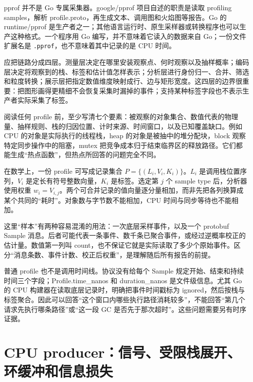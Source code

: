 \documentclass[UTF8,fontset=fandol,openany,11pt]{ctexbook}
\begin{document}
pprof 并不是 Go 专属采集器。google/pprof 项目自述的职责是读取 profiling samples，解析 profile.proto，再生成文本、调用图和火焰图等报告。Go 的 runtime/pprof 是生产者之一；其他语言运行时、原生采样器或转换程序也可以生产这种格式。一个程序用 Go 编写，并不意味着它读入的数据来自 Go；一份文件扩展名是 \texttt{.\allowbreak{}pprof}，也不意味着其中记录的是 CPU 时间。\cite{pp-scope}\cite{pp-proto}


应把链路分成四层。测量层决定在哪里安装观察点、何时观察以及抽样概率；编码层决定将观察到的栈、标签和估计值怎样表示；分析层进行身份归一、合并、筛选和粒度转换；展示层把指定数值维度映射成行、边与矩形宽度。这四层的边界很重要：把图形画得更精细不会恢复采集时漏掉的事件；支持某种标签字段也不表示生产者实际采集了标签。\cite{pp-proto}\cite{pp-cpu-builder}


阅读任何 profile 前，至少写清七个要素：被观察的对象集合、数值代表的物理量、抽样规则、栈的归因位置、计时来源、时间窗口，以及已知覆盖缺口。例如 CPU 的对象是实际执行的线程栈，heap 的对象是被抽中的堆分配块，block 观察特定同步操作中的阻塞，mutex 把竞争成本归于结束临界区的释放路径。它们都能生成“热点函数”，但热点所回答的问题完全不同。\cite{pp-cpu-runtime}\cite{pp-heap-scale}\cite{pp-mprof}\cite{pp-sema}


在数学上，一份 profile 可写成记录集合 \(P=\{(L_i,V_i,K_i)\}\)。\(L_i\) 是调用栈位置序列，\(V_i\) 是定长有符号整数向量，\(K_i\) 是标签。选定第 \(j\) 个 sample type 后，分析器使用权重 \(w_i=V_{i,j}\)。两个可合并记录的值向量逐分量相加，而非先把各列换算成某个共同的“耗时”。对象数与字节数不能相加，CPU 时间与同步等待也不能相加。\cite{pp-proto}


这里“样本”有两种容易混淆的用法：一次底层采样事件，以及一个 protobuf Sample 消息。后者可能代表一条事件、数千条已聚合事件，或经过逆概率校正的估计量。数值第一列叫 count，也不保证它就是实际读取了多少个原始事件。区分“消息条数、事件计数、校正后权重”，是理解随后所有报告的前提。\cite{pp-cpu-builder}\cite{pp-heap-scale}\cite{pp-mprof}


普通 profile 也不是调用时间线。协议没有给每个 Sample 规定开始、结束和持续时间三个字段；Profile.time\_\allowbreak{}nanos 和 duration\_\allowbreak{}nanos 是文件级信息。尤其 Go 的 CPU 构建器在读取底层记录时，明确把事件时间戳标为 ignored，然后按栈与标签聚合。因此可以回答“这个窗口内哪些执行路径消耗较多”，不能回答“第几个请求先执行哪条路径”或“这一段 GC 是否先于那次超时”。这些问题需要另有时序证据。\cite{pp-proto}\cite{pp-cpu-builder}


\section{CPU producer：信号、受限栈展开、环缓冲和信息损失}
\end{document}
